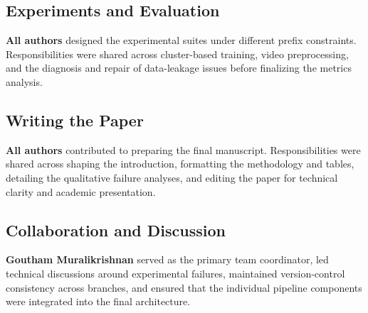\documentclass{article}
\begin{document}
\subsection{Experiments and Evaluation}
\textbf{All authors} designed the experimental suites under different prefix constraints. Responsibilities were shared across cluster-based training, video preprocessing, and the diagnosis and repair of data-leakage issues before finalizing the metrics analysis.

\subsection{Writing the Paper}
\textbf{All authors} contributed to preparing the final manuscript. Responsibilities were shared across shaping the introduction, formatting the methodology and tables, detailing the qualitative failure analyses, and editing the paper for technical clarity and academic presentation.

\subsection{Collaboration and Discussion}
\textbf{Goutham Muralikrishnan} served as the primary team coordinator, led technical discussions around experimental failures, maintained version-control consistency across branches, and ensured that the individual pipeline components were integrated into the final architecture.
\end{document}
